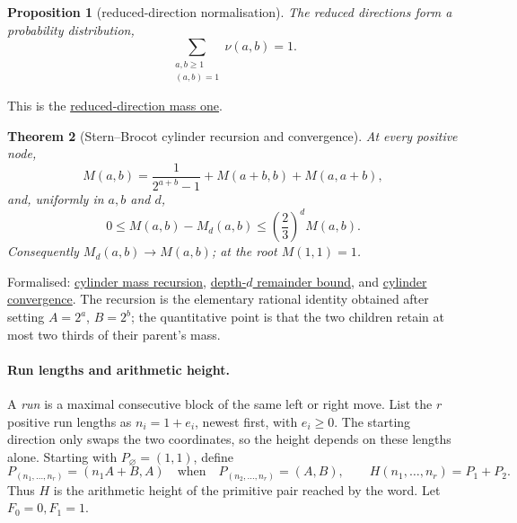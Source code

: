 \documentclass[11pt]{article}
\newcommand{\commit}{312b96c0d149ed466725c62d4ef24cfc91bca34e}
\newcommand{\repobase}{https://github.com/wcook04/plectis-lean-erdos249-257/blob/\commit}
\newcommand{\PK}{Erdos249257}
\newcommand{\lword}[4]{\href{\repobase/\PK/#1\#L#2}{#4}}
\newtheorem{theorem}{Theorem}[section]
\newtheorem{proposition}[theorem]{Proposition}
\theoremstyle{definition}
\theoremstyle{remark}
\begin{document}
{\begin{proposition}[reduced-direction normalisation]\label{res:directionnormalization}
The reduced directions form a probability distribution,
\[
  \sum_{\substack{a,b\ge1\\(a,b)=1}}\nu(a,b)=1.
\]
\end{proposition}
\noindent This is the
\lword{GcdMomentCalculus.lean}{349}{tsum_pos_coprime_inv_mersenne_eq_one}{reduced-direction mass one}.

\begin{theorem}[Stern--Brocot cylinder recursion and convergence]
\label{res:sternbrocotcylinders}
At every positive node,
\[
  M(a,b)=\frac1{2^{a+b}-1}+M(a+b,b)+M(a,a+b),
\]
and, uniformly in \(a,b\) and \(d\),
\[
  0\le M(a,b)-M_d(a,b)
  \le \left(\frac23\right)^d M(a,b).
\]
Consequently \(M_d(a,b)\to M(a,b)\); at the root \(M(1,1)=1\).
\end{theorem}
\noindent Formalised:
\lword{GcdMomentCalculus.lean}{474}{cylinderMass_split}{cylinder mass recursion},
\lword{GcdMomentCalculus.lean}{525}{sternBrocotDepthMass_error}{depth-$d$ remainder bound}, and
\lword{GcdMomentCalculus.lean}{560}{tendsto_sternBrocotDepthMass}{cylinder convergence}.
The recursion is the elementary rational identity obtained after setting
\(A=2^a\), \(B=2^b\); the quantitative point is that the two children retain
at most two thirds of their parent's mass.

\paragraph{Run lengths and arithmetic height.}
A \emph{run} is a maximal consecutive block of the same left or right move.
List the $r$ positive run lengths as $n_i=1+e_i$, newest first, with $e_i\ge0$.
The starting direction only swaps the two coordinates, so the height depends
on these lengths alone.  Starting with \(P_\varnothing=(1,1)\), define
\[
  P_{(n_1,\ldots,n_r)}=(n_1A+B,A)
  \quad\text{when}\quad P_{(n_2,\ldots,n_r)}=(A,B),
  \qquad H(n_1,\ldots,n_r)=P_1+P_2.
\]
Thus \(H\) is the arithmetic height of the primitive pair reached by the
word.  Let \(F_0=0,F_1=1\).

}
\end{document}
